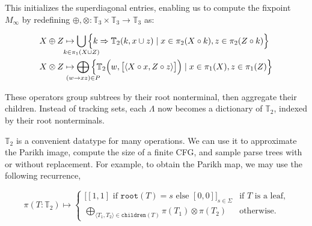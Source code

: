 \documentclass[sigplan,review,anonymous,acmsmall]{acmart}\settopmatter{printfolios=false,printccs=false,printacmref=false}
\begin{document}
\noindent This initializes the superdiagonal entries, enabling us to compute the fixpoint $M_\infty$ by redefining $\oplus, \otimes: \mathbb{T}_3 \times \mathbb{T}_3 \rightarrow \mathbb{T}_3$ as:

\begin{align}
  X \oplus Z &\mapsto \bigcup_{\mathclap{k\in \pi_1(X \cup Z)}}\Big\{k \Rightarrow \mathbb{T}_2(k, x \cup z) \mid x \in \pi_2(X\circ k), z \in \pi_2(Z\circ k)\Big\}\\
  X \otimes Z &\mapsto \bigoplus_{\mathclap{(w\rightarrow xz) \in P}}\Big\{\mathbb{T}_2\Big(w, \big[\langle X\circ x, Z\circ z\rangle\big]\Big) \mid x \in \pi_1(X), z \in \pi_1(Z)\Big\}
\end{align}

These operators group subtrees by their root nonterminal, then aggregate their children. Instead of tracking sets, each $\Lambda$ now becomes a dictionary of $\mathbb{T}_2$, indexed by their root nonterminals.


  $\mathbb{T}_2$ is a convenient datatype for many operations. We can use it to approximate the Parikh image, compute the size of a finite CFG, and sample parse trees with or without replacement. For example, to obtain the Parikh map, we may use the following recurrence,

\begin{equation}
  \pi(T: \mathbb{T}_2) \mapsto \begin{cases}
  \big[[1, 1] \text{ if } \texttt{root}(T) = s \text{ else } [0, 0]\big]_{s\in \Sigma}  & \text{if $T$ is a leaf,} \\
  \bigoplus_{\langle T_1, T_2\rangle \in \texttt{children}(T)} \pi(T_1) \otimes \pi(T_2) & \text{otherwise.}
  \end{cases}
\end{equation}

\end{document}
